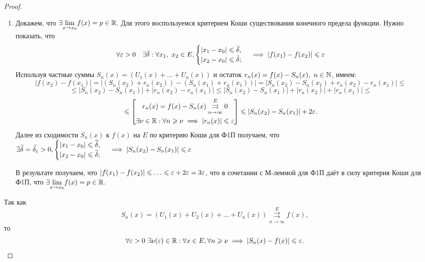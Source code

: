 \documentclass[../../main.tex]{subfiles}
\begin{document}
\begin{proof}
	\;
	
	\begin{enumerate}
		\item Докажем, что $\exists \underset{x \to x_0}{\lim} f(x) = 
	p \in \mathbb{R}$. Для этого воспользуемся критерием Коши существования 
	конечного предела функции. Нужно показать, что
	\begin{equation}
	\label{lec2:17}
	\forall \varepsilon > 0 \quad \exists \bar\delta :
	\forall x_1,\ x_2 \in E, 
	\begin{cases}
	|x_1 - x_0| \leqslant \bar\delta, \\
	|x_2 - x_0| \leqslant \bar\delta;
	\end{cases} \implies
	|f(x_1) - f(x_2)| \leqslant \varepsilon
	\end{equation}
	Используя частные суммы $S_n(x) = (U_1(x) + \ldots + U_n(x))$ и 
	остаток $r_n(x) = f(x) - S_n(x),\ n \in \mathbb{N}$, имеем:
	\[
	|f(x_2) - f(x_1)| = |(S_n(x_2) + r_n(x_2)) - (S_n(x_1) + r_n(x_1))| =
	|S_n(x_2) - S_n(x_1) + r_n(x_2) - r_n(x_1)| \leq 
	\]
	\[
	\leq |S_n(x_2) - S_n(x_1)| + |r_n(x_2) - r_n(x_1)| \leq 
	|S_n(x_2) - S_n(x_1)| + |r_n(x_2)| + |r_n(x_1)| \leq
	\]
	\[
	\leqslant 
	\left[
	\begin{gathered}
	r_n(x) = f(x) - S_n(x) \overset{E}
	{\underset{n \to \infty}\rightrightarrows} 0 \\
	\exists \nu \in \mathbb{R} : \forall n \geqslant \nu \implies
	|r_n(x)| \leqslant \varepsilon
	\end{gathered}
	\right] \leqslant |S_n(x_2) - S_n(x_1)| + 2\varepsilon.
	\]
	Далее из сходимости $S_n(x)$ к $f(x)$ на $E$ по критерию Коши для Ф1П
	получаем, что $\exists \widetilde{\delta} = \widetilde{\delta_\varepsilon} > 0,
	\begin{cases} 
	|x_1 - x_0| \leqslant \widetilde{\delta}, \\
	|x_2 - x_0| \leqslant \widetilde{\delta};
	\end{cases} \implies
	|S_n(x_2) - S_n(x_1)| \leqslant \varepsilon$ 
	
	В результате получаем, что $|f(x_1) - f(x_2)| \leqslant \ldots \leqslant 
	\varepsilon + 2\varepsilon = 3\varepsilon$, что в сочетании с М-леммой для Ф1П даёт
	в силу критерия Коши для Ф1П, что $\exists \underset{x \to x_0}{\lim}
	f(x) = p \in \mathbb{R}$.
	\end{enumerate}
	
	Так как 
\[
S_n(x) = (U_1(x) + U_2(x) + \ldots + U_n(x)) \overset{E}{\underset{n \to 
\infty}\rightrightarrows} f(x),
\]
 то
\begin{equation} \label{eq:18}
	\forall \varepsilon > 0 \ \exists \nu(\varepsilon) \in \mathbb{R} : \forall x \in E, \forall n \geqslant 
	\nu \implies |S_n(x) - f(x)| \leqslant \varepsilon.
\end{equation}


\end{proof}
\end{document}
